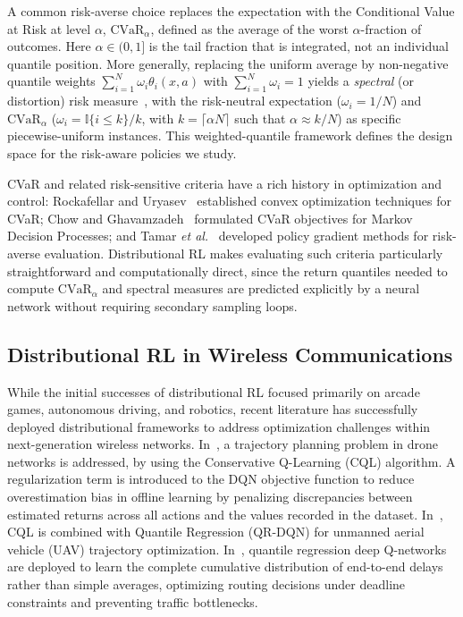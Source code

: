 \documentclass{ieeetmlcn}
\begin{document}
A common risk-averse choice replaces the expectation with the Conditional Value at Risk at level $\alpha$, $\mathrm{CVaR}_\alpha$, defined as the average of the worst $\alpha$-fraction of outcomes. Here $\alpha \in (0, 1]$ is the tail fraction that is integrated, not an individual quantile position. More generally, replacing the uniform average by non-negative quantile weights $\sum_{i=1}^N \omega_i \theta_i(x,a)$ with $\sum_{i=1}^N \omega_i = 1$ yields a \emph{spectral} (or distortion) risk measure~\cite{acerbi}, with the risk-neutral expectation ($\omega_i = 1/N$) and $\mathrm{CVaR}_\alpha$ ($\omega_i = \mathbb{I}\{i \le k\}/k$, with $k = \lceil\alpha N\rceil$ such that $\alpha \approx k/N$) as specific piecewise-uniform instances. This weighted-quantile framework defines the design space for the risk-aware policies we study.

CVaR and related risk-sensitive criteria have a rich history in optimization and control: Rockafellar and Uryasev~\cite{rockafellar} established convex optimization techniques for CVaR; Chow and Ghavamzadeh~\cite{chow2014} formulated CVaR objectives for Markov Decision Processes; and Tamar \textit{et al.}~\cite{tamar2015} developed policy gradient methods for risk-averse evaluation. Distributional RL makes evaluating such criteria particularly straightforward and computationally direct, since the return quantiles needed to compute $\mathrm{CVaR}_\alpha$ and spectral measures are predicted explicitly by a neural network without requiring secondary sampling loops.

\subsection{Distributional RL in Wireless Communications}
\label{sec:rel-wireless}
While the initial successes of distributional RL focused primarily on arcade games, autonomous driving, and robotics, recent literature has successfully deployed distributional frameworks to address optimization challenges within next-generation wireless networks. In~\cite{EldeebConservative}, a trajectory planning problem in drone networks is addressed, by using the Conservative Q-Learning (CQL) algorithm. A regularization term is introduced to the DQN objective function to reduce overestimation bias in offline learning by penalizing discrepancies between estimated returns across all actions and the values recorded in the dataset. In~\cite{EldeebOffline}, CQL is combined with Quantile Regression (QR-DQN) for unmanned aerial vehicle (UAV) trajectory optimization. In~\cite{Liu24}, quantile regression deep Q-networks are deployed to learn the complete cumulative distribution of end-to-end delays rather than simple averages, optimizing routing decisions under deadline constraints and preventing traffic bottlenecks.
\end{document}
